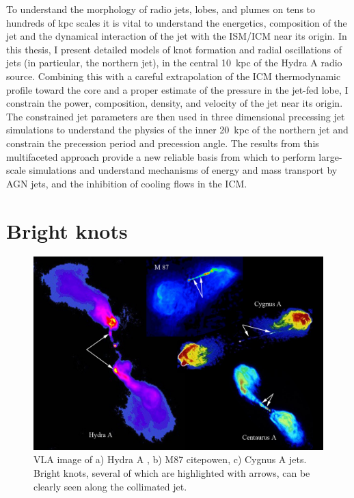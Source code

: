 To understand the morphology of radio jets, lobes, and plumes on tens to hundreds of kpc scales it is vital to understand the energetics, composition of the jet and the dynamical interaction of the jet with the ISM/ICM near its origin. In this thesis, I present detailed models of knot formation and radial oscillations of jets (in particular, the northern jet), in the central 10~kpc of the Hydra A radio source. Combining this with a careful extrapolation of the ICM thermodynamic profile toward the core and a proper estimate of the pressure in the jet-fed lobe, I constrain the power, composition, density, and velocity of the jet near its origin. The constrained jet parameters are then used in three dimensional precessing jet simulations to understand the physics of the inner 20~kpc of the northern jet and constrain the precession period and precession angle. The results from this multifaceted approach provide a new reliable basis from which to perform large-scale simulations and understand mechanisms of energy and mass transport by AGN jets, and the inhibition of cooling flows in the ICM.


\section{Bright knots}

\begin{figure}
\centering
\includegraphics[width=\linewidth]{bright_knots.jpg}
\caption{VLA image of a) Hydra A \citep{taylor90}, b) M87 citep{owen}, c) Cygnus A jets. Bright knots, several of which are highlighted with arrows, can be clearly seen along the collimated jet.}
\label{knot}
\end{figure}


